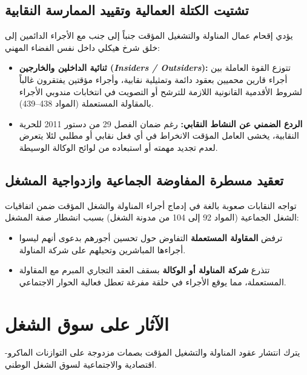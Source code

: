 \subsection{تشتيت الكتلة العمالية وتقييد الممارسة النقابية}
يؤدي إقحام عمال المناولة والتشغيل المؤقت جنباً إلى جنب مع الأجراء الدائمين إلى خلق شرخ هيكلي داخل نفس الفضاء المهني:
\begin{itemize}[leftmargin=*, itemsep=5pt]
    \item \textbf{ثنائية الداخلين والخارجين (\textit{Insiders / Outsiders}):} تتوزع القوة العاملة بين أجراء قارين محميين بعقود دائمة وتمثيلية نقابية، وأجراء مؤقتين يفتقرون غالباً لشروط الأقدمية القانونية اللازمة للترشح أو التصويت في انتخابات مندوبي الأجراء بالمقاولة المستعملة (المواد \textenglish{438}--\textenglish{439}).
    \item \textbf{الردع الضمني عن النشاط النقابي:} رغم ضمان الفصل \textenglish{29} من دستور \textenglish{2011} للحرية النقابية، يخشى العامل المؤقت الانخراط في أي فعل نقابي أو مطلبي لئلا يتعرض لعدم تجديد مهمته أو استبعاده من لوائح الوكالة الوسيطة.
\end{itemize}

\subsection{تعقيد مسطرة المفاوضة الجماعية وازدواجية المشغل}
تواجه النقابات صعوبة بالغة في إدماج أجراء المناولة والشغل المؤقت ضمن اتفاقيات الشغل الجماعية (المواد \textenglish{92} إلى \textenglish{104} من مدونة الشغل) بسبب انشطار صفة المشغل:
\begin{itemize}[leftmargin=*, itemsep=5pt]
    \item ترفض \textbf{المقاولة المستعملة} التفاوض حول تحسين أجورهم بدعوى أنهم ليسوا أجراءها المباشرين وتحيلهم على شركة المناولة.
    \item تتذرع \textbf{شركة المناولة أو الوكالة} بسقف العقد التجاري المبرم مع المقاولة المستعملة، مما يوقع الأجراء في حلقة مفرغة تعطل فعالية الحوار الاجتماعي.
\end{itemize}

\section{الآثار على سوق الشغل}

يترك انتشار عقود المناولة والتشغيل المؤقت بصمات مزدوجة على التوازنات الماكرو-اقتصادية والاجتماعية لسوق الشغل الوطني.

